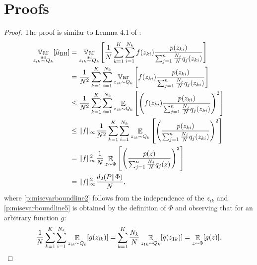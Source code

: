 \chapter{Proofs} \label{app:proof}

\misevarbound*
%
\begin{proof}
	The proof is similar to Lemma 4.1 of \cite{metelli2018policy}:
    \begin{align}
    \mathop{\mathbb{V}\mathrm{ar}}_{z_{ik} \stackrel{\text{iid}}{\sim} Q_k} [\widehat{\mu}_{\text{BH}}]&  = \mathop{\mathbb{V}\mathrm{ar}}_{z_{ik} \stackrel{\text{iid}}{\sim} Q_k} \left[ \frac{1}{N} \sum_{k=1}^K \sum_{i=1}^{N_k}  f(z_{ki})\frac{p(z_{ki})}{\sum_{j=1}^n \frac{N_j}{N} q_j(z_{ki})} \right] \notag \\
    & = \frac{1}{N^2} \sum_{k=1}^K \sum_{i=1}^{N_k} \mathop{\mathbb{V}\mathrm{ar}}_{z_{ik} \sim Q_k} \left[   f(z_{ki}) \frac{p(z_{ki})}{\sum_{j=1}^n \frac{N_j}{N} q_j(z_{ki})} \right] \label{p:misevarboundline2} \\
    & \le \frac{1}{N^2} \sum_{k=1}^K \sum_{i=1}^{N_k} \mathop{\mathbb{E}}_{z_{ik} \sim Q_k} \left[   \left( f(z_{ki})   \frac{p(z_{ki})}{\sum_{j=1}^n \frac{N_j}{N} q_j(z_{ki})} \right)^2 \right] \notag\\
    & \le \|f\|_{\infty} \frac{1}{N^2} \sum_{k=1}^K \sum_{i=1}^{N_k} \mathop{\mathbb{E}}_{z_{ik} \sim Q_k} \left[   \left( \frac{p(z_{ki})}{\sum_{j=1}^n \frac{N_j}{N} q_j(z_{ki})} \right)^2 \right]  \notag\\
    & = \|f\|_{\infty}^2 \frac{1}{N} \mathop{\mathbb{E}}_{z \sim \Phi} \left[ \left(\frac{p(z)}{\sum_{j=1}^n \frac{N_j}{N} q_j(z)} \right)^2 \right] \label{p:misevarboundline5}\\
    &= \|f\|_{\infty}^2 \frac{d_{2}(P\|\Phi)}{N},  \notag
    \end{align}
    where \eqref{p:misevarboundline2} follows from the independence of the $z_{ik}$ and \eqref{p:misevarboundline5} is obtained by the definition of $\Phi$ and observing that for an arbitrary function $g$:
    \begin{equation}
    \label{eq:expectationdecomposition}
    	\frac{1}{N} \sum_{k=1}^K \sum_{i=1}^{N_k} \mathop{\mathbb{E}}_{z_{ik} \sim Q_k}[g(z_{ik})] =  \sum_{k=1}^K \frac{N_k}{N} \mathop{\mathbb{E}}_{z_{1k} \sim Q_k}[g(z_{1k})] = \mathop{\mathbb{E}}_{z \sim \Phi}[g(z)].
    \end{equation}
\end{proof}


